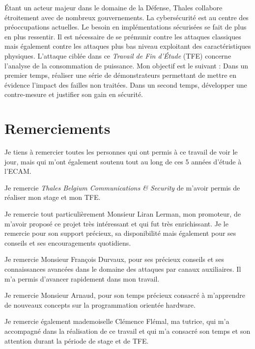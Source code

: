 \documentclass[oneside]{book}
\begin{document}
Étant un acteur majeur dans le domaine de la Défense, Thales collabore étroitement avec de nombreux gouvernements. La cybersécurité est au centre des préoccupations actuelles. Le besoin en implémentations sécurisées se fait de plus en plus ressentir. Il est nécessaire de se prémunir contre les attaques classiques mais également contre les attaques plus bas niveau exploitant des caractéristiques physiques. L'attaque ciblée dans ce \textit{Travail de Fin d'Étude} (TFE) concerne l'analyse de la consommation de puissance. Mon objectif est le suivant : Dans un premier temps, réaliser une série de démonstrateurs permettant de mettre en évidence l'impact des failles non traitées. Dans un second temps, développer une contre-mesure et justifier son gain en sécurité.

\newpage
\strut
\thispagestyle{empty}
\newpage


\chapter*{Remerciements}

Je tiens à remercier toutes les personnes qui ont permis à ce travail de voir le jour, mais qui m’ont également soutenu tout au long de ces 5 années d’étude à l’ECAM.

Je remercie \textit{Thales Belgium Communications \& Security} de m’avoir permis de réaliser mon stage et mon TFE.

Je remercie tout particulièrement Monsieur Liran Lerman, mon promoteur, de m’avoir proposé ce projet très intéressant et qui fut très enrichissant. Je le remercie pour son support précieux, sa disponibilité mais également pour ses conseils et ses encouragements quotidiens.

Je remercie Monsieur François Durvaux, pour ses précieux conseils et ses connaissances avancées dans le domaine des attaques par canaux auxiliaires. Il m'a permis d'avancer rapidement dans mon travail.

Je remercie Monsieur Arnaud, pour son temps précieux consacré à m'apprendre de nouveaux concepts sur la programmation orientée hardware. 

Je remercie également mademoiselle Clémence Flémal, ma tutrice, qui m’a accompagné dans la réalisation de ce travail et qui m’a consacré son temps et son attention durant la période de stage et de TFE.
\end{document}
